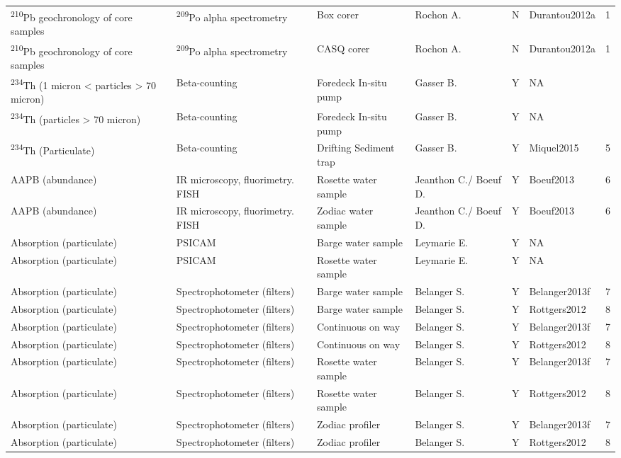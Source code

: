 \begin{ThreePartTable}
\begin{longtable}[t]{lllllll}
\textsuperscript{210}Pb geochronology of core samples & \textsuperscript{209}Po alpha spectrometry & Box corer & Rochon A. & N & Durantou2012a & 1\\
\addlinespace
\textsuperscript{210}Pb geochronology of core samples & \textsuperscript{209}Po alpha spectrometry & CASQ corer & Rochon A. & N & Durantou2012a & 1\\
\textsuperscript{234}Th (1 micron < particles > 70 micron) & Beta-counting & Foredeck In-situ pump & Gasser B. & Y & NA & \\
\textsuperscript{234}Th (particles > 70 micron) & Beta-counting & Foredeck In-situ pump & Gasser B. & Y & NA & \\
\textsuperscript{234}Th (Particulate) & Beta-counting & Drifting Sediment trap & Gasser B. & Y & Miquel2015 & 5\\
AAPB (abundance) & IR microscopy, fluorimetry. FISH & Rosette water sample & Jeanthon C./ Boeuf D. & Y & Boeuf2013 & 6\\
\addlinespace
AAPB (abundance) & IR microscopy, fluorimetry. FISH & Zodiac water sample & Jeanthon C./ Boeuf D. & Y & Boeuf2013 & 6\\
Absorption (particulate) & PSICAM & Barge water sample & Leymarie E. & Y & NA & \\
Absorption (particulate) & PSICAM & Rosette water sample & Leymarie E. & Y & NA & \\
Absorption (particulate) & Spectrophotometer (filters) & Barge water sample & Belanger S. & Y & Belanger2013f & 7\\
Absorption (particulate) & Spectrophotometer (filters) & Barge water sample & Belanger S. & Y & Rottgers2012 & 8\\
\addlinespace
Absorption (particulate) & Spectrophotometer (filters) & Continuous on way & Belanger S. & Y & Belanger2013f & 7\\
Absorption (particulate) & Spectrophotometer (filters) & Continuous on way & Belanger S. & Y & Rottgers2012 & 8\\
Absorption (particulate) & Spectrophotometer (filters) & Rosette water sample & Belanger S. & Y & Belanger2013f & 7\\
Absorption (particulate) & Spectrophotometer (filters) & Rosette water sample & Belanger S. & Y & Rottgers2012 & 8\\
Absorption (particulate) & Spectrophotometer (filters) & Zodiac profiler & Belanger S. & Y & Belanger2013f & 7\\
\addlinespace
Absorption (particulate) & Spectrophotometer (filters) & Zodiac profiler & Belanger S. & Y & Rottgers2012 & 8\\

\end{longtable}
\end{ThreePartTable}
